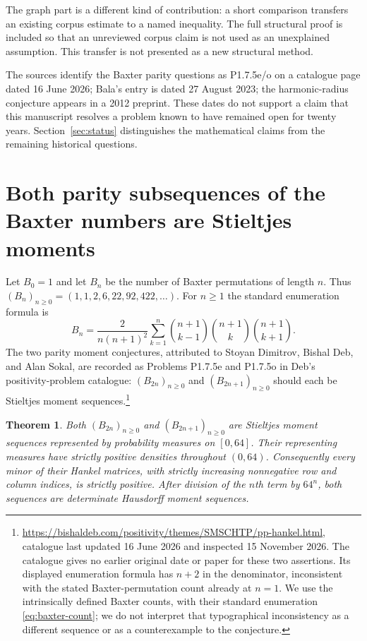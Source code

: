 \documentclass[11pt,a4paper]{article}
\newtheorem{theorem}{Theorem}[section]
\theoremstyle{remark}\newtheorem{remark}[theorem]{Remark}
\numberwithin{equation}{section}
\begin{document}
The graph part is a different kind of contribution: a short comparison
transfers an existing corpus estimate to a named inequality.
The full structural proof is included so that an unreviewed corpus
claim is not used as an unexplained assumption. This transfer is not
presented as a new structural method.

The sources identify the Baxter parity questions as P1.7.5e/o on a
catalogue page dated 16 June 2026; Bala's entry is dated 27 August 2023;
the harmonic-radius conjecture appears in a 2012 preprint. These dates
do not support a claim that this manuscript resolves a problem known
to have remained open for twenty years. Section~\ref{sec:status}
distinguishes the mathematical claims from the remaining historical
questions.
\section{Both parity subsequences of the Baxter numbers are Stieltjes moments}
\label{sec:baxter-parity}

Let $B_0=1$ and let $B_n$ be the number of Baxter permutations of length
$n$. Thus $(B_n)_{n\ge0}=(1,1,2,6,22,92,422,\ldots)$. For $n\ge1$ the
standard enumeration formula \cite{ChungGrahamHoggattKleiman1978} is
\begin{equation}\label{eq:baxter-count}
 B_n=\frac{2}{n(n+1)^2}\sum_{k=1}^n
 \binom{n+1}{k-1}\binom{n+1}{k}\binom{n+1}{k+1}.
\end{equation}
The two parity moment conjectures, attributed to Stoyan Dimitrov, Bishal
Deb, and Alan Sokal, are recorded as Problems P1.7.5e and P1.7.5o in
Deb's positivity-problem catalogue: $(B_{2n})_{n\ge0}$ and
$(B_{2n+1})_{n\ge0}$ should each be Stieltjes moment sequences.\footnote{
\url{https://bishaldeb.com/positivity/themes/SMSCHTP/pp-hankel.html},
catalogue last updated 16 June 2026 and inspected 15 November 2026.
The catalogue gives no earlier original date or paper for these two assertions. Its displayed enumeration formula has
$n+2$ in the denominator, inconsistent with the stated Baxter-permutation
count already at $n=1$. We use the intrinsically defined Baxter counts,
with their standard enumeration \eqref{eq:baxter-count}; we do not
interpret that typographical inconsistency as a different sequence or
as a counterexample to the conjecture.}

\begin{theorem}\label{thm:baxter-parity}
Both $(B_{2n})_{n\ge0}$ and $(B_{2n+1})_{n\ge0}$ are Stieltjes moment
sequences represented by probability measures on $[0,64]$. Their
representing measures have strictly positive densities throughout
$(0,64)$. Consequently every minor of their Hankel matrices, with
strictly increasing nonnegative row and column indices, is strictly
positive. After division of the $n$th term by $64^n$, both sequences
are determinate Hausdorff moment sequences.
\end{theorem}
\end{document}
